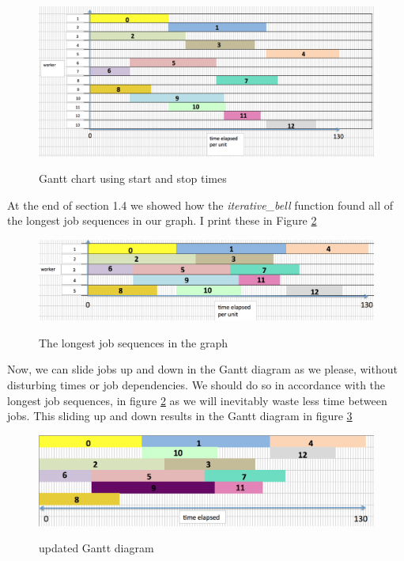 \documentclass[paper=a4, fontsize=12pt]{scrartcl} %
\numberwithin{equation}{section}       %
\numberwithin{figure}{section}         %
\numberwithin{table}{section}          %
\begin{document}
\begin{figure}[h]
\caption{Gantt chart using start and stop times}
\centering
\includegraphics[scale=0.55]{final1}\label{first}
\end{figure}

At the end of section 1.4 we showed how the \textit{iterative\_bell} function found all of the longest job sequences in our graph. I print these in Figure \ref{second}

\begin{figure}[h]
\caption{The longest job sequences in the graph}
\centering
\includegraphics[scale=0.5]{final2}\label{second}
\end{figure}

Now, we can slide jobs up and down in the Gantt diagram as we please, without disturbing times or job dependencies. We should do so in accordance with the longest job sequences, in figure \ref{second} as we will inevitably waste less time between jobs. This sliding up and down results in the Gantt diagram in figure \ref{third}

\begin{figure}[h]
\caption{updated Gantt diagram}
\centering
\includegraphics[scale=0.6]{group}\label{third}
\end{figure}
\end{document}
